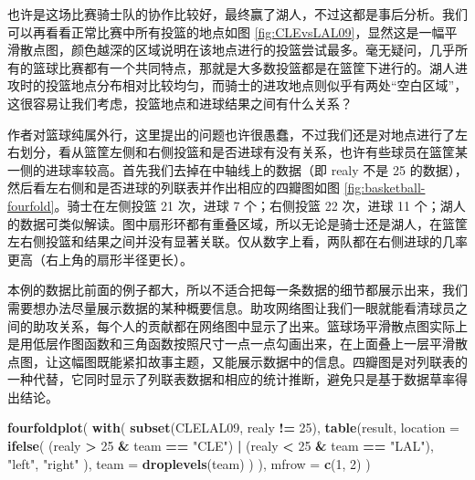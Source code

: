\documentclass[
  b5paper,
  UTF8,twoside]{book}
\newenvironment{Shaded}{\begin{snugshade}}{\end{snugshade}}
\newcommand{\AttributeTok}[1]{\textcolor[rgb]{0.13,0.29,0.53}{#1}}
\newcommand{\DecValTok}[1]{\textcolor[rgb]{0.00,0.00,0.81}{#1}}
\newcommand{\FunctionTok}[1]{\textcolor[rgb]{0.13,0.29,0.53}{\textbf{#1}}}
\newcommand{\NormalTok}[1]{#1}
\newcommand{\SpecialCharTok}[1]{\textcolor[rgb]{0.81,0.36,0.00}{\textbf{#1}}}
\newcommand{\StringTok}[1]{\textcolor[rgb]{0.31,0.60,0.02}{#1}}
\begin{document}
也许是这场比赛骑士队的协作比较好，最终赢了湖人，不过这都是事后分析。我们可以再看看正常比赛中所有投篮的地点如图 \ref{fig:CLEvsLAL09}，显然这是一幅平滑散点图，颜色越深的区域说明在该地点进行的投篮尝试最多。毫无疑问，几乎所有的篮球比赛都有一个共同特点，那就是大多数投篮都是在篮筐下进行的。湖人进攻时的投篮地点分布相对比较均匀，而骑士的进攻地点则似乎有两处``空白区域''，这很容易让我们考虑，投篮地点和进球结果之间有什么关系？

作者对篮球纯属外行，这里提出的问题也许很愚蠢，不过我们还是对地点进行了左右划分，看从篮筐左侧和右侧投篮和是否进球有没有关系，也许有些球员在篮筐某一侧的进球率较高。首先我们去掉在中轴线上的数据（即 realy 不是 25 的数据），然后看左右侧和是否进球的列联表并作出相应的四瓣图如图 \ref{fig:basketball-fourfold}。骑士在左侧投篮 21 次，进球 7 个；右侧投篮 22 次，进球 11 个；湖人的数据可类似解读。图中扇形环都有重叠区域，所以无论是骑士还是湖人，在篮筐左右侧投篮和结果之间并没有显著关联。仅从数字上看，两队都在右侧进球的几率更高（右上角的扇形半径更长）。

本例的数据比前面的例子都大，所以不适合把每一条数据的细节都展示出来，我们需要想办法尽量展示数据的某种概要信息。助攻网络图让我们一眼就能看清球员之间的助攻关系，每个人的贡献都在网络图中显示了出来。篮球场平滑散点图实际上是用低层作图函数和三角函数按照尺寸一点一点勾画出来，在上面叠上一层平滑散点图，让这幅图既能紧扣故事主题，又能展示数据中的信息。四瓣图是对列联表的一种代替，它同时显示了列联表数据和相应的统计推断，避免只是基于数据草率得出结论。

\begin{Shaded}
\begin{Highlighting}[]
\FunctionTok{fourfoldplot}\NormalTok{(}
  \FunctionTok{with}\NormalTok{(}
    \FunctionTok{subset}\NormalTok{(CLELAL09, realy }\SpecialCharTok{!=} \DecValTok{25}\NormalTok{),}
    \FunctionTok{table}\NormalTok{(result,}
      \AttributeTok{location =} \FunctionTok{ifelse}\NormalTok{(}
\NormalTok{        (realy }\SpecialCharTok{\textgreater{}} \DecValTok{25} \SpecialCharTok{\&}\NormalTok{ team }\SpecialCharTok{==} \StringTok{"CLE"}\NormalTok{) }\SpecialCharTok{|}\NormalTok{ (realy }\SpecialCharTok{\textless{}} \DecValTok{25} \SpecialCharTok{\&}\NormalTok{ team }\SpecialCharTok{==} \StringTok{"LAL"}\NormalTok{),}
        \StringTok{"left"}\NormalTok{, }\StringTok{"right"}
\NormalTok{      ),}
      \AttributeTok{team =} \FunctionTok{droplevels}\NormalTok{(team)}
\NormalTok{    )}
\NormalTok{  ),}
  \AttributeTok{mfrow =} \FunctionTok{c}\NormalTok{(}\DecValTok{1}\NormalTok{, }\DecValTok{2}\NormalTok{)}
\NormalTok{)}
\end{Highlighting}
\end{Shaded}
\end{document}
